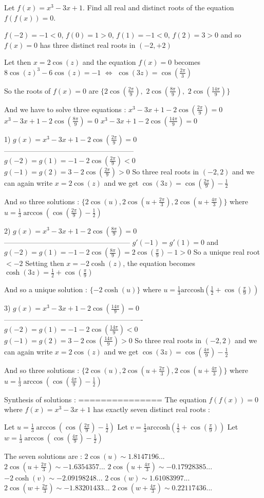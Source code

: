 \begin{solution}
	\begin{tcolorbox}Let $f(x)=x^3-3x+1$. Find all real and distinct roots of the equation $f(f(x))=0$.\end{tcolorbox}

$f(-2)=-1<0$, $f(0)=1>0$, $f(1)=-1<0$, $f(2)=3>0$ and so $f(x)=0$ has three distinct real roots in $(-2,+2)$

Let then $x=2\cos(z)$ and the equation $f(x)=0$ becomes $8\cos(z)^3-6\cos(z)=-1$ $\iff$ $\cos(3z)=\cos(\frac{2\pi}3)$

So the roots of $f(x)=0$ are $\{2\cos(\frac{2\pi}9),$ $2\cos(\frac{8\pi}9),$ $2\cos(\frac{14\pi}9)\}$

And we have to solve three equations :
$x^3-3x+1-2\cos(\frac{2\pi}9)=0$
$x^3-3x+1-2\cos(\frac{8\pi}9)=0$
$x^3-3x+1-2\cos(\frac{14\pi}9)=0$

1) $g(x)=x^3-3x+1-2\cos(\frac{2\pi}9)=0$
------------------------------------------------------
$g(-2)=g(1)=-1-2\cos(\frac{2\pi}9)<0$
$g(-1)=g(2)=3-2\cos(\frac{2\pi}9)>0$
So three real roots in $(-2,2)$ and we can again write $x=2\cos(z)$ and we get $\cos(3z)=\cos(\frac{2\pi}9)-\frac 12$

And so three solutions : $\{2\cos(u),2\cos(u+\frac{2\pi}3),2\cos(u+\frac{4\pi}3)\}$ where $u=\frac 13\arccos(\cos(\frac{2\pi}9)-\frac 12)$

2) $g(x)=x^3-3x+1-2\cos(\frac{8\pi}9)=0$
-----------------------------------------------------
$g'(-1)=g'(1)=0$ and $g(-2)=g(1)=-1-2\cos(\frac{8\pi}9)=2\cos(\frac{\pi}9)-1>0$
So a unique real root $<-2$
Setting then $x=-2\cosh(z)$, the equation becomes $\cosh(3z)=\frac 12+\cos(\frac{\pi}9)$

And so a unique solution : $\{-2\cosh(u)\}$ where $u=\frac 13\text{arccosh}(\frac 12+\cos(\frac{\pi}9))$

3) $g(x)=x^3-3x+1-2\cos(\frac{14\pi}9)=0$
----------------------------------------------------------
$g(-2)=g(1)=-1-2\cos(\frac{14\pi}9)<0$
$g(-1)=g(2)=3-2\cos(\frac{14\pi}9)>0$
So three real roots in $(-2,2)$ and we can again write $x=2\cos(z)$ and we get $\cos(3z)=\cos(\frac{4\pi}9)-\frac 12$

And so three solutions : $\{2\cos(u),2\cos(u+\frac{2\pi}3),2\cos(u+\frac{4\pi}3)\}$ where $u=\frac 13\arccos(\cos(\frac{4\pi}9)-\frac 12)$

Synthesis of solutions :
===============
The equation $f(f(x))=0$ where $f(x)=x^3-3x+1$ has exactly seven distinct real roots :

Let $u=\frac 13\arccos(\cos(\frac{2\pi}9)-\frac 12)$
Let $v=\frac 13\text{arccosh}(\frac 12+\cos(\frac{\pi}9))$
Let $w=\frac 13\arccos(\cos(\frac{4\pi}9)-\frac 12)$

The seven solutions are :
$2\cos(u)\sim 1.8147196...$
$2\cos(u+\frac{2\pi}3)\sim -1.6354357...$
$2\cos(u+\frac{4\pi}3)\sim -0.17928385...$
$-2\cosh(v)\sim -2.09198248...$
$2\cos(w)\sim 1.61083997...$
$2\cos(w+\frac{2\pi}3)\sim -1.83201433...$
$2\cos(w+\frac{4\pi}3)\sim 0.22117436...$
\end{solution}
